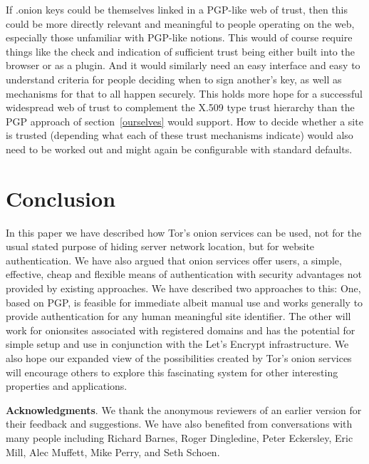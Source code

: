\documentclass[10pt, conference, compsocconf]{styles/IEEEtran}
\newcommand{\point}[1]{\noindent\textbf{#1}.}
\begin{document}
If .onion keys could be themselves linked in a PGP-like web of trust,
then this could be more directly relevant and meaningful to people
operating on the web, especially those unfamiliar with PGP-like
notions. This would of course require things like the check and
indication of sufficient trust being either built into the browser or
as a plugin. And it would similarly need an easy interface and easy to
understand criteria for people deciding when to sign another's key, as
well as mechanisms for that to all happen securely. This holds more
hope for a successful widespread web of trust to complement the X.509
type trust hierarchy than the PGP approach of section~\ref{ourselves}
would support. How to decide whether a site is trusted (depending what
each of these trust mechanisms indicate) would also need to be worked
out and might again be configurable with standard defaults.



\section{Conclusion}

In this paper we have described how Tor's onion services can be used,
not for the usual stated purpose of hiding server network location,
but for website authentication.  We have also argued that onion
services offer users, a simple, effective, cheap and flexible means of
authentication with security advantages not provided by existing
approaches. We have described two approaches to this: One, based on
PGP, is feasible for immediate albeit manual use and works generally
to provide authentication for any human meaningful site identifier. 
The other will work for onionsites associated with registered domains
and has the potential for simple setup and use in conjunction with the
Let's Encrypt infrastructure.  We also hope our expanded view of the
possibilities created by Tor's onion services will encourage others to
explore this fascinating system for other interesting properties and
applications.


\point{Acknowledgments}
We thank the anonymous reviewers of an earlier version for their
feedback and suggestions.  We have also benefited from conversations
with many people including Richard Barnes, Roger Dingledine, Peter
Eckersley, Eric Mill, Alec Muffett, Mike Perry, and Seth Schoen.
\end{document}
